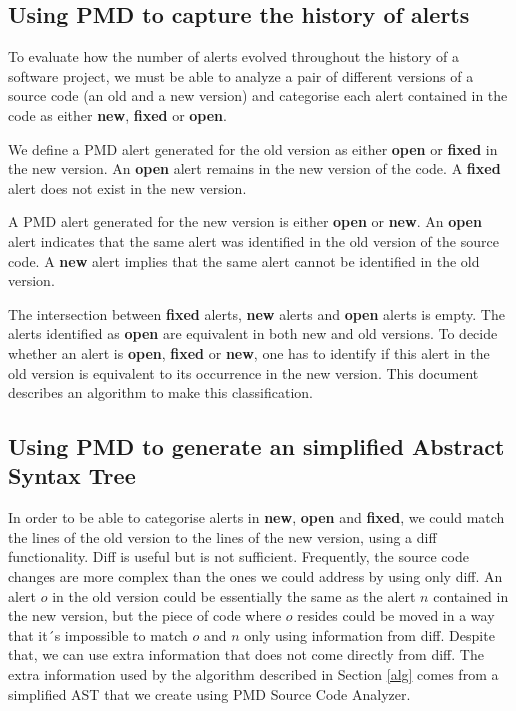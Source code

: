 \documentclass[
]{article}
\begin{document}
\normalsize

\subsection{Using PMD to capture the history of alerts}\label{history}

To evaluate how the number of alerts evolved throughout the history of a
software project, we must be able to analyze a pair of different
versions of a source code (an old and a new version) and categorise each
alert contained in the code as either \textbf{new}, \textbf{fixed} or
\textbf{open}.

We define a PMD alert generated for the old version as either
\textbf{open} or \textbf{fixed} in the new version. An \textbf{open}
alert remains in the new version of the code. A \textbf{fixed} alert
does not exist in the new version.

A PMD alert generated for the new version is either \textbf{open} or
\textbf{new}. An \textbf{open} alert indicates that the same alert was
identified in the old version of the source code. A \textbf{new} alert
implies that the same alert cannot be identified in the old version.

The intersection between \textbf{fixed} alerts, \textbf{new} alerts and
\textbf{open} alerts is empty. The alerts identified as \textbf{open}
are equivalent in both new and old versions. To decide whether an alert
is \textbf{open}, \textbf{fixed} or \textbf{new}, one has to identify if
this alert in the old version is equivalent to its occurrence in the new
version. This document describes an algorithm to make this
classification.

\subsection{Using PMD to generate an simplified Abstract Syntax Tree }\label{ast}

In order to be able to categorise alerts in \textbf{new}, \textbf{open}
and \textbf{fixed}, we could match the lines of the old version to the
lines of the new version, using a diff functionality. Diff is useful but
is not sufficient. Frequently, the source code changes are more complex
than the ones we could address by using only diff. An alert \(o\) in the
old version could be essentially the same as the alert \(n\) contained
in the new version, but the piece of code where \(o\) resides could be
moved in a way that it´s impossible to match \(o\) and \(n\) only using
information from diff. Despite that, we can use extra information that
does not come directly from diff. The extra information used by the
algorithm described in Section \ref{alg} comes from a simplified AST
that we create using PMD Source Code Analyzer.
\end{document}
